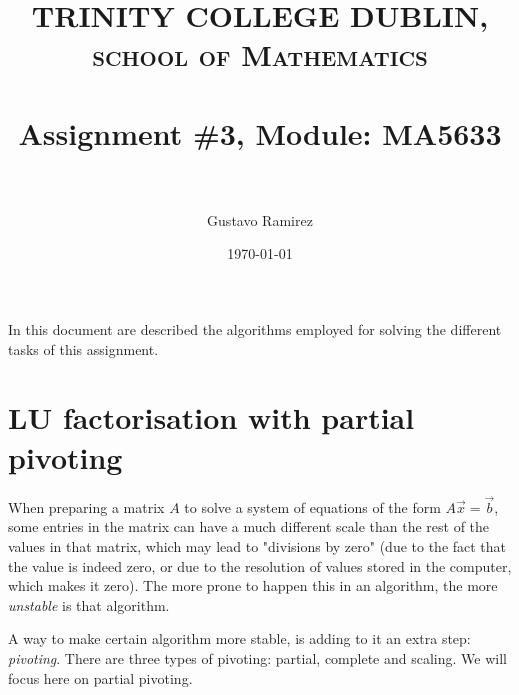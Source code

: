 \documentclass[paper=a4, fontsize=11pt]{scrartcl} %
\title{	
\normalfont \normalsize 
\textsc{TRINITY COLLEGE DUBLIN, school of Mathematics} \\ [25pt] %
\horrule{0.5pt} \\[0.4cm] %
\huge Assignment \#3, Module: MA5633 \\ %
\horrule{2pt} \\[0.5cm] %
}
\author{Gustavo Ramirez} %
\date{\normalsize\today} %
\numberwithin{equation}{section} %
\numberwithin{figure}{section} %
\numberwithin{table}{section} %
\begin{document}
\maketitle %




In this document are described the algorithms employed for solving the different tasks of this assignment.



\newpage


\begin{comment}

USEFUL LINKS:

official sources for terminology:
-----
http://www.intel.com/content/www/us/en/support/topics/glossary.html
https://www-01.ibm.com/software/globalization/terminology/a.html
-----




about IMB processors:
-----

insert in google: list of ibm processors
https://en.wikipedia.org/wiki/List_of_IBM_products
https://www-01.ibm.com/software/passportadvantage/guide_to_identifying_processor_family.html
http://www.nextplatform.com/2015/08/10/ibm-roadmap-extends-power-chips-to-2020-and-beyond/
http://www.theverge.com/2015/7/9/8919091/ibm-7nm-transistor-processor
https://www.ibm.com/developerworks/ibmi/library/i-ibmi-7_2-and-ibm-power8/
-----




\end{comment}


\section{LU factorisation with partial pivoting}

When preparing a matrix $A$ to solve a system of equations of the form $A\vec{x} = \vec{b}$, some entries in the matrix can have a much different scale than the rest of the values in that matrix, which may lead to "divisions by zero" (due to the fact that the value is indeed zero, or due to the resolution of values stored in the computer, which makes it zero). The more prone to happen this in an algorithm, the more \textit{unstable} is that algorithm.

A way to make certain algorithm more stable, is adding to it an extra step: \textit{pivoting}. There are three types of pivoting: partial, complete and scaling. We will focus here on partial pivoting.
\end{document}
